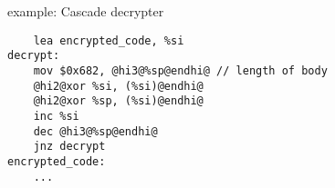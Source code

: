 \usetikzlibrary{calc}
\begin{frame}[fragile,label=cascade]{example: Cascade decrypter}
\begin{lstlisting}
    lea encrypted_code, %si
decrypt:
    mov $0x682, @hi3@%sp@endhi@ // length of body
    @hi2@xor %si, (%si)@endhi@
    @hi2@xor %sp, (%si)@endhi@
    inc %si
    dec @hi3@%sp@endhi@
    jnz decrypt
encrypted_code:
    ...
\end{lstlisting}
\end{frame}


